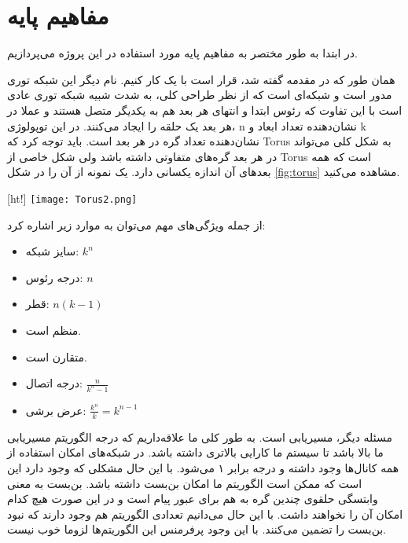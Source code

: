 


\section{مفاهیم پایه}



در ابتدا به طور مختصر به مفاهیم پایه مورد استفاده در این پروژه می‌پردازیم.

همان طور که در مقدمه گفته شد، قرار است با یک
 کار کنیم. نام دیگر این شبکه توری مدور  است و شبکه‌ای است که از نظر طراحی کلی، به شدت شبیه شبکه توری عادی  است با این تفاوت که رئوس ابتدا و انتهای هر بعد هم به یکدیگر متصل هستند و عملا در هر بعد یک حلقه  را ایجاد می‌کنند. در این توپولوژی،‌ n نشان‌دهنده تعداد ابعاد و k نشان‌دهنده تعداد گره در هر بعد است. باید توجه کرد که Torus به شکل کلی می‌تواند در هر بعد گره‌های متفاوتی داشته باشد ولی
 شکل خاصی از Torus است که همه بعد‌های آن اندازه یکسانی دارد. یک نمونه از آن را در شکل \ref{fig:torus} 
 مشاهده می‌کنید.
 
 

 [ht!]
 \centering
 \texttt{[image: Torus2.png]}
 \label{fig:torus}

 
 



از جمله ویژگی‌های مهم  می‌توان به موارد زیر اشاره کرد:

\begin{itemize}
	\item
	سایز شبکه: $k^n$
	
	\item
	درجه رئوس: $n$
	
	\item 
	قطر: $n(k-1)$
	
	\item 
	منظم‌ است.
	
	\item 
	متقارن است.
	
	\item
	درجه اتصال:
	$\frac{n}{k^n -1}$
	
	\item 
	عرض برشی:
	$\frac{k^n}{k} = k^{n-1}$
	
	
	
\end{itemize}


مسئله دیگر، مسیریابی  است. به طور کلی ما علاقه‌داریم که درجه  الگوریتم مسیریابی ما بالا باشد تا سیستم ما کارایی بالاتری داشته باشد. در شبکه‌های
 امکان استفاده از همه کانال‌ها وجود داشته و درجه  برابر ۱ می‌شود. با این حال مشکلی که وجود دارد این است که ممکن است الگوریتم ما امکان بن‌بست داشته باشد. بن‌بست به معنی وابتسگی حلقوی چندین گره به هم برای عبور پیام است و در این صورت هیچ کدام امکان آن را نخواهند داشت. با این حال می‌دانیم تعدادی الگوریتم  هم وجود دارند که نبود بن‌بست را تضمین می‌کنند. با این وجود پرفرمنس این الگوریتم‌ها لزوما خوب نیست.


